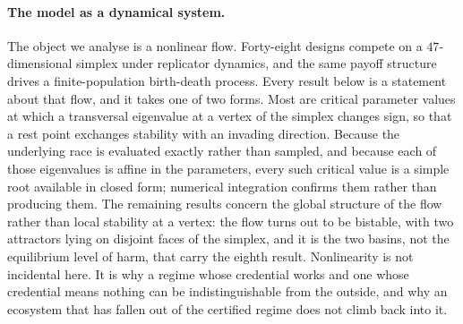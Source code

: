 \paragraph{The model as a dynamical system.}
The object we analyse is a nonlinear flow. Forty-eight designs compete on a
$47$-dimensional simplex under replicator dynamics, and the same payoff
structure drives a finite-population birth-death process. Every result below
is a statement about that flow, and it takes one of two forms. Most are
critical parameter values at which a transversal eigenvalue at a vertex of the
simplex changes sign, so that a rest point exchanges stability with an invading
direction. Because the underlying race is evaluated exactly rather than
sampled, and because each of those eigenvalues is affine in the parameters,
every such critical value is a simple root available in closed form; numerical
integration confirms them rather than producing them. The remaining results
concern the global structure of the flow rather than local stability at a
vertex: the flow turns out to be bistable, with two attractors lying on
disjoint faces of the simplex, and it is the two basins, not the equilibrium
level of harm, that carry the eighth result. Nonlinearity is not incidental
here. It is why a regime whose credential works and one whose credential means
nothing can be indistinguishable from the outside, and why an ecosystem that
has fallen out of the certified regime does not climb back into it.


